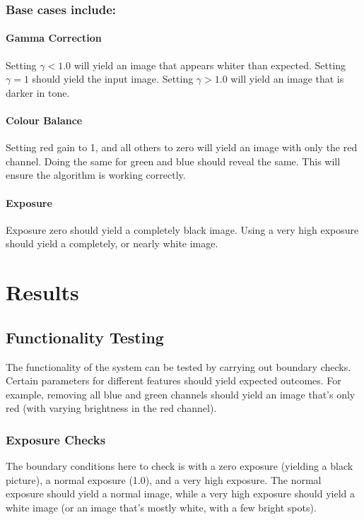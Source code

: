 \documentclass[10pt,a4paper]{article}
\begin{document}
\subsubsection{Base cases include:}
\paragraph{Gamma Correction}
Setting $\gamma < 1.0$ will yield an image that appears whiter than expected. Setting $\gamma = 1$ should yield the input image.
Setting $\gamma > 1.0$ will yield an image that is darker in tone. 

\paragraph{Colour Balance}
Setting red gain to 1, and all others to zero will yield an image with only the red channel. Doing the same for green and blue should reveal the same.
This will ensure the algorithm is working correctly.

\paragraph{Exposure}
Exposure zero should yield a completely black image. Using a very high exposure should yield a completely, or nearly white image.

\section{Results}


\subsection{Functionality Testing}
The functionality of the system can be tested by carrying out boundary checks. Certain parameters for different features should yield 
expected outcomes. For example, removing all blue and green channels should yield an image that's only red (with varying brightness in the red channel).

\subsubsection{Exposure Checks}
The boundary conditions here to check is with a zero exposure (yielding a black picture), a normal exposure (1.0), and a very high exposure.
The normal exposure should yield a normal image, while a very high exposure should yield a white image (or an image that's mostly white, with a few
bright spots).
\end{document}
